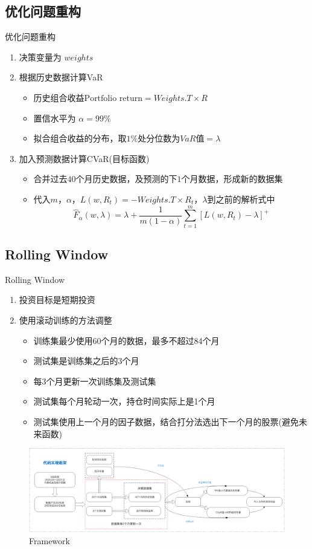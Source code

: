 \documentclass[CJK,aspectratio=43]{beamer}  %
\begin{document}
\subsection{优化问题重构}
\begin{frame}{优化问题重构}
	\begin{enumerate}
		\item 决策变量为 $weights$
		\item 根据历史数据计算VaR
		\begin{itemize}
			\item 历史组合收益$ \text{Portfolio return} = Weights.T \times R $
			\item 置信水平为 $\alpha=99\%$
			\item 拟合组合收益的分布，取$1\%$处分位数为$VaR$值$=\lambda$
		\end{itemize}
		\item 加入预测数据计算CVaR(目标函数)
		\begin{itemize}
			\item 合并过去$40$个月历史数据，及预测的下$1$个月数据，形成新的数据集
			\item 代入$m$，$\alpha$，$L(w,R_t)=-Weights.T \times R_t$，$\lambda$到之前的解析式中
			$$
			\widehat{F}_{\alpha}(w,\lambda)=\lambda+\frac{1}{m(1-\alpha)}\sum_{t=1}^{m}[L(w,R_t)-\lambda]^{+}
			$$
		\end{itemize}
	\end{enumerate}
\end{frame}

\subsection{Rolling Window}
\begin{frame}{Rolling Window}
	\begin{enumerate}
		\item 投资目标是短期投资
		\item 使用滚动训练的方法调整
		\begin{itemize}
			\item 训练集最少使用60个月的数据，最多不超过84个月
			\item 测试集是训练集之后的3个月
			\item 每3个月更新一次训练集及测试集
			\item 测试集每个月轮动一次，持仓时间实际上是1个月
			\item 测试集使用上一个月的因子数据，结合打分法选出下一个月的股票(避免未来函数)
		\end{itemize}
	\end{enumerate}
	\begin{figure}
		\centering
		\includegraphics[width=0.95\linewidth]{pic/framework}
		\caption{Framework}
		\label{fig:framework}
	\end{figure}
\end{frame}
\end{document}
